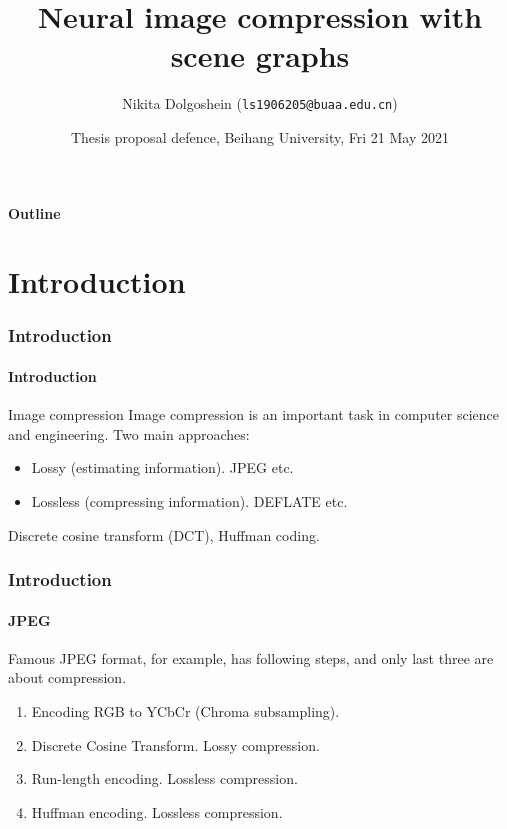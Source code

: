 \documentclass[10pt]{beamer}
\title{Neural image compression with scene graphs}
\author{Nikita Dolgoshein (\texttt{ls1906205@buaa.edu.cn})}
\date{Thesis proposal defence, Beihang University, Fri  21 May 2021}
\begin{document}
\begin{frame}[plain]
    \maketitle
\end{frame}

\begin{frame}
    \framesubtitle{Outline}
    \tableofcontents
\end{frame}

\section{Introduction}

\begin{frame}
    \frametitle{Introduction}
    \framesubtitle{Introduction}
    \begin{block}{Image compression}
        Image compression is an important task in computer science and engineering.
        Two main approaches:
        \begin{itemize}
            \item Lossy (estimating information). JPEG etc.
            \item Lossless (compressing information). DEFLATE etc.
        \end{itemize}
        Discrete cosine transform (DCT), Huffman coding.
    \end{block}
\end{frame}

\begin{frame}
    \frametitle{Introduction}
    \framesubtitle{JPEG}
    Famous JPEG format, for example, has following steps, and only last three are about compression.

    \begin{enumerate}
        \item Encoding RGB to YCbCr (Chroma subsampling).
        \item Discrete Cosine Transform. Lossy compression.
        \item Run-length encoding. Lossless compression.
        \item Huffman encoding. Lossless compression.
    \end{enumerate}
\end{frame}
\end{document}
